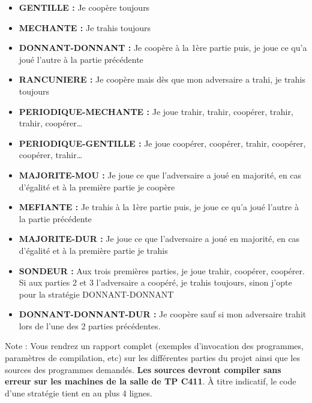 \documentclass[11pt]{article}
\begin{document}
\begin{itemize}
    \item \textbf{GENTILLE :} Je coopère toujours 

    \item \textbf{MECHANTE :} Je trahis toujours

    \item \textbf{DONNANT-DONNANT :} Je coopère à la 1ère partie puis, je joue ce qu'a joué l'autre à la partie précédente

    \item \textbf{RANCUNIERE :} Je coopère mais dès que mon adversaire a trahi, je trahis toujours

    \item \textbf{PERIODIQUE-MECHANTE :} Je joue trahir, trahir, coopérer, trahir, trahir, coopérer…

    \item \textbf{PERIODIQUE-GENTILLE :} Je joue coopérer, coopérer, trahir, coopérer, coopérer, trahir…

    \item \textbf{MAJORITE-MOU :} Je joue ce que l'adversaire a joué en majorité, en cas d'égalité et à la première partie je coopère

    \item \textbf{MEFIANTE :} Je  trahis à la 1ère partie puis, je joue ce qu'a joué l'autre à la partie précédente

    \item \textbf{MAJORITE-DUR :} Je joue ce que l'adversaire a joué en majorité, en cas d'égalité et à la première partie je trahis

    \item \textbf{SONDEUR :} Aux trois premières parties, je joue trahir, coopérer, coopérer. Si aux parties 2 et 3 l'adversaire a coopéré, je trahis toujours, sinon j'opte pour la stratégie DONNANT-DONNANT 

    \item \textbf{DONNANT-DONNANT-DUR :} Je coopère sauf si mon adversaire trahit lors de l'une des 2 parties précédentes.
\end{itemize}

Note : Vous rendrez un rapport complet (exemples d'invocation des programmes, paramètres de compilation, etc) sur les différentes parties du projet ainsi que les sources des programmes demandés.
\textbf{Les sources devront compiler sans erreur sur les machines de la salle de TP C411}. 
À titre indicatif, le code d'une stratégie tient en au plus 4 lignes.
\end{document}
